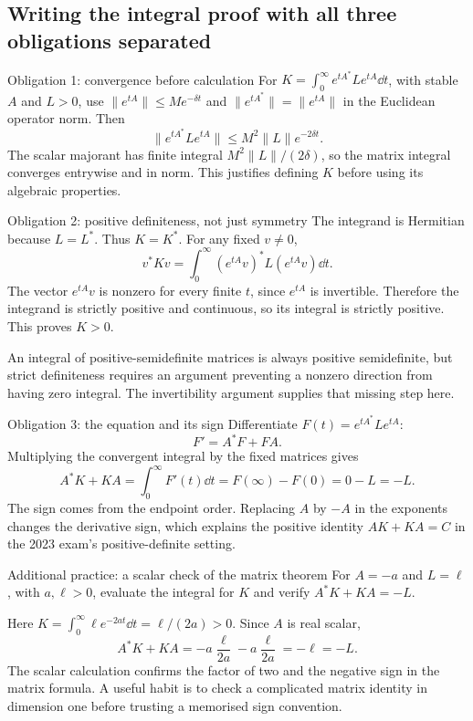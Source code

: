 \subsection{Writing the integral proof with all three obligations separated}
\begin{method}{Obligation 1: convergence before calculation}
For $K=\int_0^\infty e^{tA^*}Le^{tA}\dd t$, with stable $A$ and $L>0$, use $\|e^{tA}\|\leq Me^{-\delta t}$ and $\|e^{tA^*}\|=\|e^{tA}\|$ in the Euclidean operator norm. Then
\[\|e^{tA^*}Le^{tA}\|\leq M^2\|L\|e^{-2\delta t}.\]
The scalar majorant has finite integral $M^2\|L\|/(2\delta)$, so the matrix integral converges entrywise and in norm. This justifies defining $K$ before using its algebraic properties.
\end{method}
\begin{method}{Obligation 2: positive definiteness, not just symmetry}
The integrand is Hermitian because $L=L^*$. Thus $K=K^*$. For any fixed $v\ne0$,
\[v^*Kv=\int_0^\infty(e^{tA}v)^*L(e^{tA}v)\dd t.\]
The vector $e^{tA}v$ is nonzero for every finite $t$, since $e^{tA}$ is invertible. Therefore the integrand is strictly positive and continuous, so its integral is strictly positive. This proves $K>0$.

An integral of positive-semidefinite matrices is always positive semidefinite, but strict definiteness requires an argument preventing a nonzero direction from having zero integral. The invertibility argument supplies that missing step here.
\end{method}
\begin{method}{Obligation 3: the equation and its sign}
Differentiate $F(t)=e^{tA^*}Le^{tA}$:
\[F'=A^*F+FA.\]
Multiplying the convergent integral by the fixed matrices gives
\[A^*K+KA=\int_0^\infty F'(t)\dd t=F(\infty)-F(0)=0-L=-L.\]
The sign comes from the endpoint order. Replacing $A$ by $-A$ in the exponents changes the derivative sign, which explains the positive identity $AK+KA=C$ in the 2023 exam's positive-definite setting.
\end{method}
\begin{question}{Additional practice: a scalar check of the matrix theorem}
For $A=-a$ and $L=\ell$, with $a,\ell>0$, evaluate the integral for $K$ and verify $A^*K+KA=-L$.
\end{question}
\begin{answer}
Here $K=\int_0^\infty \ell e^{-2at}\dd t=\ell/(2a)>0$. Since $A$ is real scalar,
\[A^*K+KA=-a\frac\ell{2a}-a\frac\ell{2a}=-\ell=-L.\]
The scalar calculation confirms the factor of two and the negative sign in the matrix formula. A useful habit is to check a complicated matrix identity in dimension one before trusting a memorised sign convention.
\end{answer}

